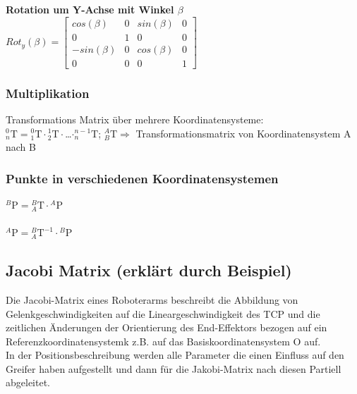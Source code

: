         \begin{minipage}{0.33\linewidth}
            \textbf{Rotation um Y-Achse mit Winkel $ \beta$}\newline
            $ Rot_y(\beta)=\begin{bmatrix}
            cos(\beta)& 0  & sin(\beta)  & 0  \\ 
             0 & 1 & 0 & 0  \\ 
            -sin(\beta)&  0 & cos(\beta) & 0 \\ 
            0 & 0 & 0  & 1
            \end{bmatrix}$
        \end{minipage}
    



	\subsubsection{Multiplikation}
		Transformations Matrix über mehrere Koordinatensysteme:\\
		
		${}^0_n\mathrm{T}={}^0_1\mathrm{T}\cdot{}^1_2\mathrm{T}\cdot{}$\ldots$\cdot{}^{n-1}_n\mathrm{T}$;
		\space\space\space\space ${}^A_B\mathrm{T} \Rightarrow$
		Transformationsmatrix von Koordinatensystem A nach B
    	
	\subsubsection{Punkte in verschiedenen Koordinatensystemen}
		${}^B\mathrm{P}={}^B_A\mathrm{T}\cdot{}^A\mathrm{P}$ \\ \\
		${}^A\mathrm{P}={}^B_A\mathrm{T}^{-1}\cdot{}^B\mathrm{P}$
		
		
		

	\subsection{Jacobi Matrix \small{ (erklärt durch Beispiel)}}
		
		
        Die Jacobi-Matrix eines Roboterarms beschreibt die Abbildung von
        Gelenkgeschwindigkeiten auf die Lineargeschwindigkeit des TCP
        und die zeitlichen Änderungen der Orientierung des End-Effektors
        bezogen auf ein Referenzkoordinatensystemk z.B. auf das
        Basiskoordinatensystem O auf. \\
        In der Positionsbeschreibung werden alle Parameter die einen Einfluss 
       auf den Greifer haben aufgestellt und dann für die Jakobi-Matrix nach diesen Partiell abgeleitet. \\
    
